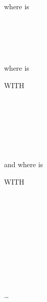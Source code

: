 where  is

\begin{syntax}
  \begin{1=}
    \identifier \\
    \literal \\
    \functionname
  \end{1=}
   \\
\end{syntax}

where  is

\begin{syntax}
  \begin{0-1}
    WITH 
    \begin{1=}
       \\
       \\
    \end{1=}
  \end{0-1}
  \begin{1=}
    \condition \\
  \end{1=} \\
\end{syntax}

and where  is

\begin{syntax}
  \begin{0-1}
    WITH 
    \begin{1=}
       \\
       \\
    \end{1=}
  \end{0-1}

   \identifier {}
  \begin{1=}
    \identifier \\
    \literal
  \end{1=}
  \begin{0-1}
    \begin{1=}
      \identifier \\
      \literal
    \end{1=}
  \end{0-1}
  \condition

  \begin{0-1}
     \identifier {}
    \begin{1=}
      \identifier \\
      \literal
    \end{1=}
    \begin{0-1}
      \begin{1=}
        \identifier \\
        \literal
      \end{1=}
    \end{0-1}

    \condition
  \end{0-1} \ldots
\end{syntax}


